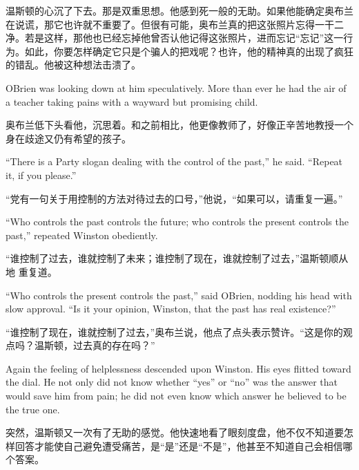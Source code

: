 \begin{paracol}{2}
\switchcolumn

温斯顿的心沉了下去。那是双重思想。他感到死一般的无助。如果他能确定奥布兰在说谎，那它也许就不重要了。但很有可能，奥布兰真的把这张照片忘得一干二净。若是这样，那他也已经忘掉他曾否认他记得这张照片，进而忘记``忘记''这一行为。如此，你要怎样确定它只是个骗人的把戏呢？也许，他的精神真的出现了疯狂的错乱。他被这种想法击溃了。

\switchcolumn*

O\textquotesingle Brien was looking down at him speculatively. More than
ever he had the air of a teacher taking pains with a wayward but
promising child.

\switchcolumn

奥布兰低下头看他，沉思着。和之前相比，他更像教师了，好像正辛苦地教授一个身在歧途又仍有希望的孩子。

\switchcolumn*

``There is a Party slogan dealing with the control of the past,'' he said.
``Repeat it, if you please.''

\switchcolumn

``党有一句关于用控制的方法对待过去的口号，''他说，``如果可以，请重复一遍。''

\switchcolumn*

``\textquotesingle Who controls the past controls the future; who
controls the present controls the past,\textquotesingle'' repeated
Winston obediently.

\switchcolumn

``谁控制了过去，谁就控制了未来；谁控制了现在，谁就控制了过去，''温斯顿顺从地
重复道。

\switchcolumn*

``\textquotesingle Who controls the present controls the
past,\textquotesingle'' said O\textquotesingle Brien, nodding his head
with slow approval. ``Is it your opinion, Winston, that the past has real
existence?''

\switchcolumn

``谁控制了现在，谁就控制了过去，''奥布兰说，他点了点头表示赞许。``这是你的观点吗？温斯顿，过去真的存在吗？''

\switchcolumn*

Again the feeling of helplessness descended upon Winston. His eyes
flitted toward the dial. He not only did not know whether ``yes'' or ``no''
was the answer that would save him from pain; he did not even know which
answer he believed to be the true one.

\switchcolumn

突然，温斯顿又一次有了无助的感觉。他快速地看了眼刻度盘，他不仅不知道要怎样回答才能使自己避免遭受痛苦，是``是''还是``不是''，他甚至不知道自己会相信哪个答案。


\end{paracol}
